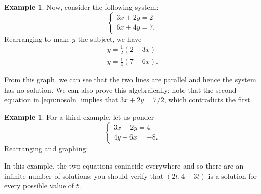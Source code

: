 \documentclass[a4paper,leqno]{article}
\numberwithin{equation}{section}
\theoremstyle{definition}
\newtheorem{ex}[equation]{Example}
\theoremstyle{remark}
\begin{document}
\begin{ex}
  Now, consider the following system:
  \begin{equation}
    \begin{cases}
      3x + 2y = 2\\
      6x + 4y = 7.
    \end{cases}
  \end{equation}
  Rearranging to make $ y $ the subject, we have
  \begin{gather*}
    y = \frac{1}{2}(2 - 3x)\\
    y = \frac{1}{4}(7 - 6x).
  \end{gather*}
  \begin{center}
  \end{center}
  From this graph, we can see that the two lines are parallel and hence the system has no solution. We can also prove this algebraically: note
  that the second equation in \ref{eqn:nosoln} implies that $ 3x + 2y = 7/2 $, which contradicts the first.
\end{ex}

\begin{ex}
  For a third example, let us ponder
  \begin{equation}\label{eqn:nosoln}
    \begin{cases}
      3x - 2y = 4\\
      4y - 6x = -8.
    \end{cases}
  \end{equation}
  Rearranging and graphing:
  \begin{center}
  \end{center}
  In this example, the two equations conincide everywhere and so there are an infinite number of solutions; you should
  verify that $ (2t, 4-3t) $ is a solution for every possible value of $ t $.
\end{ex}
\end{document}
